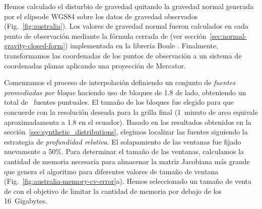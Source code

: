 Hemos calculado el disturbio de gravedad quitando la gravedad normal generada
por el elipsode WGS84 sobre los datos de gravedad observados
(Fig.~\ref{fig:australia}).
Los valores de gravedad normal fueron calculados en cada punto de observación
mediante la fórmula cerrada de \citet{ligotze2001} (ver
sección~\ref{sec:normal-gravity-closed-form}) implementada en la librería Boule
\citep{boule2020}.
Finalmente, transformamos las coordenadas de los puntos de observación a un
sistema de coordenadas planas aplicando una proyección de Mercator.

Comenzamos el proceso de interpolación definiendo un conjunto de \emph{fuentes
promediadas por bloque} haciendo uso de bloques de 1.8\km{} de lado, obteniendo
un total de \AustraliaEqlNSources{}~fuentes puntuales.
El tamaño de los bloques fue elegido para que concuerde con la resolución
deseada para la grilla final (1~minuto de arco equivale aproximadamenta
a 1.8\km{} en el ecuador).
Basado en los resultados obtenidos en la sección~\ref{sec:synthetic_distributions},
elegimos localizar las fuentes siguiendo la estrategia de \emph{profundidad
relativa}.
El solapamiento de las ventanas fue fijado nuevamente a 50\%.
Para determinar el tamaño de las ventanas, calculamos la cantidad de memoria
necesaria para almacenar la matriz Jacobiana más grande que genera el algoritmo
para diferentes valores de tamaño de ventana
(Fig.~\ref{fig:australia-memory-cv-error}a).
Hemos seleccionado un tamaño de venta de \AustraliaEqlWindowSize{} con el
objetivo de limitar la cantidad de memoria por debajo de los 16~Gigabytes.

